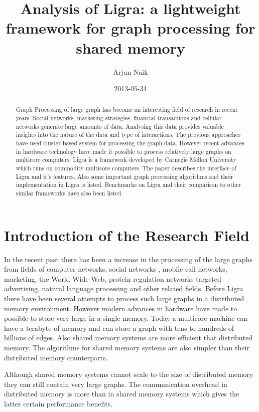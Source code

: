 \documentclass[a4paper,10pt,twoside]{article}
\title{ Analysis of Ligra: a lightweight framework for graph processing for shared memory}
\author{Arjun Naik}
\date{2013-05-31}
\begin{document}
\maketitle

\begin{abstract}
Graph Processing of large graph has become an interesting field of research in recent years. Social networks, marketing strategies, financial transactions and cellular networks generate large amounts of data. Analysing this data provides valuable insights into the nature of the data and type of interactions.  The previous approaches have used cluster based system for processing the graph data. However recent advances in hardware technology have made it possible to process relatively large graphs on multicore computers. Ligra is a framework developed by Carnegie Mellon University which runs on commodity multicore computers. The paper describes the interface of Ligra and it's features. Also some important graph processing algorithms and their implementation in Ligra is listed. Benchmarks on Ligra and their comparison to other similar frameworks have also been listed.
\end{abstract}

\tableofcontents

\section{Introduction of the Research Field}

In the recent past there has been a increase in the processing of the large graphs from fields of computer networks, social networks , mobile call networks, marketing, the World Wide Web, protein regulation networks targeted advertising, natural language processing and other related fields. Before Ligra \cite{Shun:2013:LLG:2442516.2442530} there have been several attempts to process such large graphs in a distributed memory environment. However modern advances in hardware have made to possible to store very large in a single memory. Today a multicore machine can have a terabyte of memory and can store a graph with tens to hundreds of billions of edges. Also shared memory systems are more efficient that distributed memory. The algorithms for shared memory systems are also simpler than their distributed memory counterparts.

	Although shared memory systems cannot scale to the size of distributed memory they can still contain very large graphs. The communication overhead in distributed memory is more than in shared memory systems which gives the latter certain performance benefits. 
\end{document}
